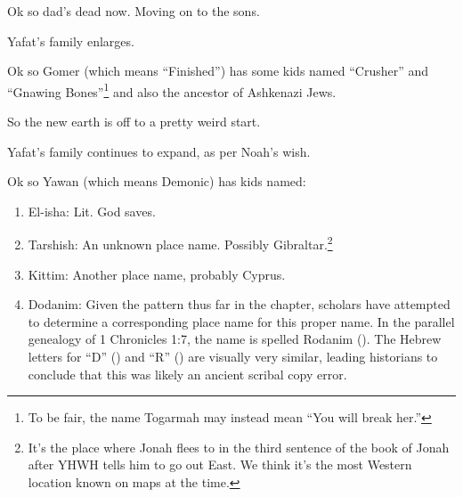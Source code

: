 

{
}
{
}
{
Ok so dad's dead now. Moving on to the sons.
}

{
}
{
}
{
	Yafat's family enlarges.
}

{
}
{
}
{
Ok so Gomer (which means ``Finished'') has some kids named ``Crusher'' and ``Gnawing Bones''\footnote{To be fair, the name Togarmah may instead mean ``You will break her.''} and also the ancestor of Ashkenazi Jews.

So the new earth is off to a pretty weird start.
}

{
}
{
}
{
	Yafat's family continues to expand, as per Noah's wish.
	
	Ok so Yawan (which means Demonic) has kids named:
	
	\begin{enumerate}
	\item El-isha: Lit. God saves.
	\item Tarshish: An unknown place name. Possibly Gibraltar.\footnote{It's the place where Jonah flees to in the third sentence of the book of Jonah after YHWH tells him to go out East. We think it's the most Western location known on maps at the time.}
	\item Kittim: Another place name, probably Cyprus.
	\item Dodanim: Given the pattern thus far in the chapter, scholars have attempted to determine a corresponding place name for this proper name.  In the parallel genealogy of 1 Chronicles 1:7, the name is spelled Rodanim (). The Hebrew letters for ``D'' () and ``R'' () are visually very similar, leading historians to conclude that this was likely an ancient scribal copy error.
	\end{enumerate}
}

